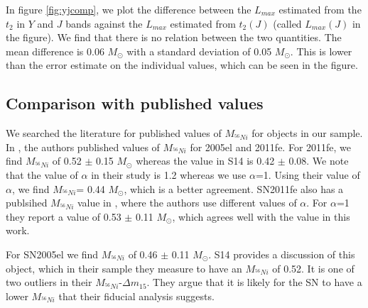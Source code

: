 In figure \ref{fig:yjcomp}, we plot the difference between the $L_{max}$ estimated from the $t_2$ in $Y$ and $J$ bands against the $L_{max}$ estimated from $t_2(J)$ (called $L_{max}(J)$ in the figure). We find that there is no relation between the two quantities. The mean difference is 0.06 $M_{\odot}$ with a standard deviation of 0.05 $M_{\odot}$. This is lower than the error estimate on the individual values, which can be seen in the figure. 	


\subsection{Comparison with published values}
We searched the literature for published values of $M_{^{56}Ni}$ for objects in our sample. In \citet{Scalzo2014} , the authors published values of $M_{^{56}Ni}$ for 2005el and 2011fe. For 2011fe, we find $M_{^{56}Ni}$ of 0.52 $\pm$ 0.15 $M_{\odot}$ whereas the value in S14 is 0.42 $\pm$ 0.08. We note that the value of $\alpha$ in their study is 1.2 whereas we use $\alpha$=1. Using their value of $\alpha$, we find $M_{^{56}Ni}$= 0.44 $M_{\odot}$, which is a better agreement. SN2011fe also has a publsihed $M_{^{56}Ni}$ value in \cite{Pereira2013}, where the authors use different values of $\alpha$. For $\alpha$=1 they report a value of 0.53 $\pm$ 0.11 $M_{\odot}$, which agrees well with the value in this work. 

For SN2005el we find $M_{^{56}Ni}$ of 0.46 $\pm$ 0.11 $M_{\odot}$. S14 provides a discussion of this object, which in their sample they measure to have an  $M_{^{56}Ni}$ of 0.52. It is one of two outliers in their $M_{^{56}Ni}$-$\Delta m_{15}$. They argue that it is likely for the SN to have a lower $M_{^{56}Ni}$ that their fiducial analysis suggests.  




























